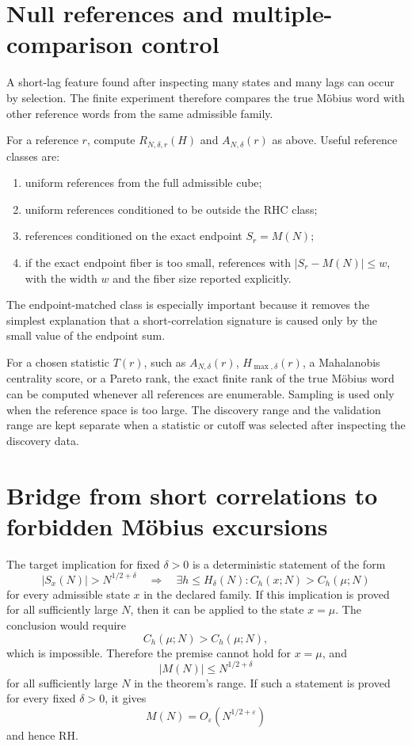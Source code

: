 \documentclass[11pt]{article}
\begin{document}
\section{Null references and multiple-comparison control}
A short-lag feature found after inspecting many states and many lags can occur by selection. The finite experiment therefore compares the true Möbius word with other reference words from the same admissible family.

For a reference $r$, compute $R_{N,\delta,r}(H)$ and $A_{N,\delta}(r)$ as above. Useful reference classes are:
\begin{enumerate}
\item uniform references from the full admissible cube;
\item uniform references conditioned to be outside the RHC class;
\item references conditioned on the exact endpoint $S_r=M(N)$;
\item if the exact endpoint fiber is too small, references with $|S_r-M(N)|\le w$, with the width $w$ and the fiber size reported explicitly.
\end{enumerate}
The endpoint-matched class is especially important because it removes the simplest explanation that a short-correlation signature is caused only by the small value of the endpoint sum.

For a chosen statistic $T(r)$, such as $A_{N,\delta}(r)$, $H_{\max,\delta}(r)$, a Mahalanobis centrality score, or a Pareto rank, the exact finite rank of the true Möbius word can be computed whenever all references are enumerable. Sampling is used only when the reference space is too large. The discovery range and the validation range are kept separate when a statistic or cutoff was selected after inspecting the discovery data.

\section{Bridge from short correlations to forbidden Möbius excursions}
The target implication for fixed $\delta>0$ is a deterministic statement of the form
\[
 |S_x(N)|>N^{1/2+\delta}
 \quad\Longrightarrow\quad
 \exists h\le H_\delta(N):
 C_h(x;N)>C_h(\mu;N)
\]
for every admissible state $x$ in the declared family. If this implication is proved for all sufficiently large $N$, then it can be applied to the state $x=\mu$. The conclusion would require
\[
 C_h(\mu;N)>C_h(\mu;N),
\]
which is impossible. Therefore the premise cannot hold for $x=\mu$, and
\[
 |M(N)|\le N^{1/2+\delta}
\]
for all sufficiently large $N$ in the theorem's range. If such a statement is proved for every fixed $\delta>0$, it gives
\[
 M(N)=O_\varepsilon(N^{1/2+\varepsilon})
\]
and hence RH.
\end{document}

